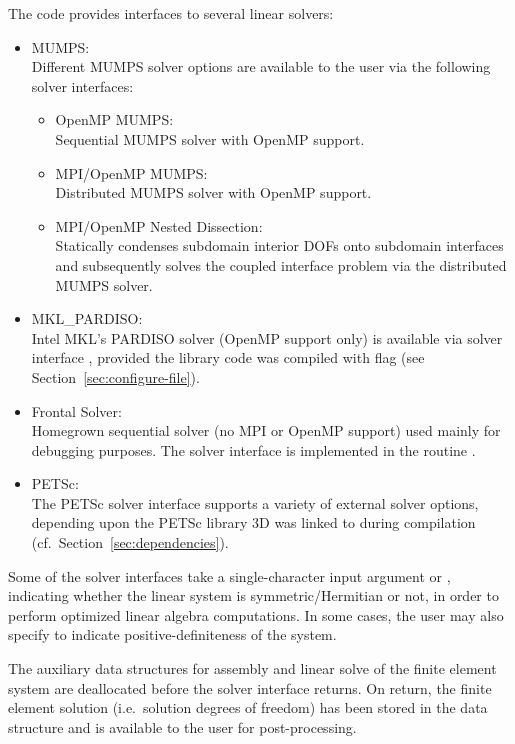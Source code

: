 The code provides interfaces to several linear solvers:
\begin{itemize}
	\item{ MUMPS: \\
		Different MUMPS solver options are available to the user via the following solver interfaces:
		\begin{itemize}
			\item{ OpenMP MUMPS:  \\
			Sequential MUMPS solver with OpenMP support.
			}
			\item{ MPI/OpenMP MUMPS:  \\
			Distributed MUMPS solver with OpenMP support.
			}
			\item{ MPI/OpenMP Nested Dissection:  \\
			Statically condenses subdomain interior DOFs onto subdomain interfaces and subsequently solves the coupled interface problem via the distributed MUMPS solver.
			}
		\end{itemize}
	}
	\item{ MKL\_PARDISO:  \\
		Intel MKL's PARDISO solver (OpenMP support only) is available via solver interface , provided the library code was compiled with flag  (see Section~\ref{sec:configure-file}).
	}
	\item{ Frontal Solver:  \\
		Homegrown sequential solver (no MPI or OpenMP support) used mainly for debugging purposes. The solver interface is implemented in the routine .
	}
	\item{ PETSc:  \\
		The PETSc solver interface supports a variety of external solver options, depending upon the PETSc library \hp3D was linked to during compilation (cf.~Section~\ref{sec:dependencies}).
	}
\end{itemize}
Some of the solver interfaces take a single-character input argument  or , indicating whether the linear system is symmetric/Hermitian or not, in order to perform optimized linear algebra computations. In some cases, the user may also specify  to indicate positive-definiteness of the system.

The auxiliary data structures for assembly and linear solve of the finite element system are deallocated before the solver interface returns. On return, the finite element solution (i.e.~solution degrees of freedom) has been stored in the data structure and is available to the user for post-processing.


%



